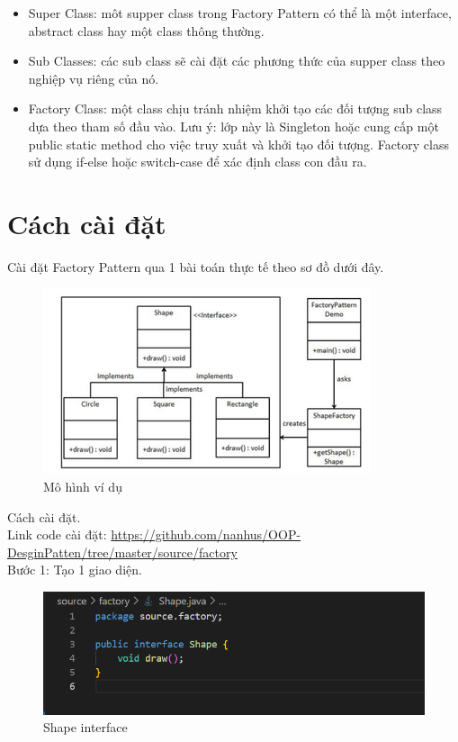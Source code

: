 \begin{itemize}
    \item Super Class: môt supper class trong Factory Pattern có thể là một interface, abstract class hay một class thông thường.
    \item Sub Classes: các sub class sẽ cài đặt các phương thức của supper class theo nghiệp vụ riêng của nó.
    \item Factory Class: một class chịu tránh nhiệm khởi tạo các đối tượng sub class dựa theo tham số đầu vào. Lưu ý: lớp này là Singleton hoặc cung cấp một public static method cho việc truy xuất và khởi tạo đối tượng. Factory class sử dụng if-else hoặc switch-case để xác định class con đầu ra.
\end{itemize}
\section{Cách cài đặt}
Cài đặt Factory Pattern qua 1 bài toán thực tế theo sơ đồ dưới đây.

\begin{figure}[!htb]
    \centering
    \includegraphics[width=\textwidth]{fig/Factory/example_structure_factory.png}
    \caption{Mô hình ví dụ}
    \label{fig:example_structure_factory}
\end{figure}
Cách cài đặt.
\\Link code cài đặt:
\url{https://github.com/nanhus/OOP-DesginPatten/tree/master/source/factory}\\

Bước 1: Tạo 1 giao diện.
\begin{figure}[!htb]
    \centering
    \includegraphics[width=\textwidth]{fig/Factory/shape_class.png}
    \caption{Shape interface}
    \label{fig:shape_class}
\end{figure}

